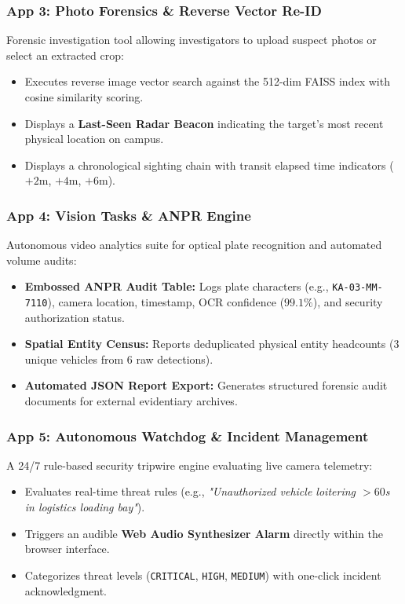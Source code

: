 \documentclass[12pt,a4paper]{article}
\begin{document}
\subsubsection{App 3: Photo Forensics \& Reverse Vector Re-ID}
Forensic investigation tool allowing investigators to upload suspect photos or select an extracted crop:
\begin{itemize}
    \item Executes reverse image vector search against the 512-dim FAISS index with cosine similarity scoring.
    \item Displays a \textbf{Last-Seen Radar Beacon} indicating the target's most recent physical location on campus.
    \item Displays a chronological sighting chain with transit elapsed time indicators ($+2\text{m}$, $+4\text{m}$, $+6\text{m}$).
\end{itemize}

\subsubsection{App 4: Vision Tasks \& ANPR Engine}
Autonomous video analytics suite for optical plate recognition and automated volume audits:
\begin{itemize}
    \item \textbf{Embossed ANPR Audit Table:} Logs plate characters (e.g., \texttt{KA-03-MM-7110}), camera location, timestamp, OCR confidence ($99.1\%$), and security authorization status.
    \item \textbf{Spatial Entity Census:} Reports deduplicated physical entity headcounts (3 unique vehicles from 6 raw detections).
    \item \textbf{Automated JSON Report Export:} Generates structured forensic audit documents for external evidentiary archives.
\end{itemize}

\subsubsection{App 5: Autonomous Watchdog \& Incident Management}
A 24/7 rule-based security tripwire engine evaluating live camera telemetry:
\begin{itemize}
    \item Evaluates real-time threat rules (e.g., \textit{"Unauthorized vehicle loitering $> 60$s in logistics loading bay"}).
    \item Triggers an audible \textbf{Web Audio Synthesizer Alarm} directly within the browser interface.
    \item Categorizes threat levels (\texttt{CRITICAL}, \texttt{HIGH}, \texttt{MEDIUM}) with one-click incident acknowledgment.
\end{itemize}
\end{document}
